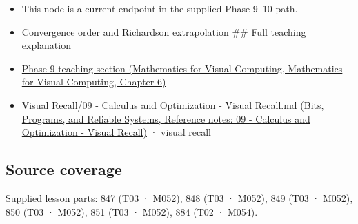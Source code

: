 \begin{itemize}
\item
  This node is a current endpoint in the supplied Phase 9--10 path.
\item
  \hyperref[appendix-aca80b6bf17a]{Convergence order and Richardson extrapolation} \#\# Full teaching explanation
\item
  \href{../02-Mathematics-for-Visual-Computing/main.pdf\#nameddest=02-foundations-ii-ch022-numerical-differentiation-and-automatic-differentiation}{Phase 9 teaching section (Mathematics for Visual Computing, Mathematics for Visual Computing, Chapter 6)}
\item
  \href{../01-Bits-Programs-and-Reliable-Systems/main.pdf\#nameddest=appendix-adf48f5dc5c1}{Visual Recall/09 - Calculus and Optimization - Visual Recall.md (Bits, Programs, and Reliable Systems, Reference notes: 09 - Calculus and Optimization - Visual Recall)} · visual recall
\end{itemize}

\subsection{Source coverage}\label{appendix-e2d7b4f2161d-source-coverage}

Supplied lesson parts: 847 (T03 · M052), 848 (T03 · M052), 849 (T03 · M052), 850 (T03 · M052), 851 (T03 · M052), 884 (T02 · M054).
